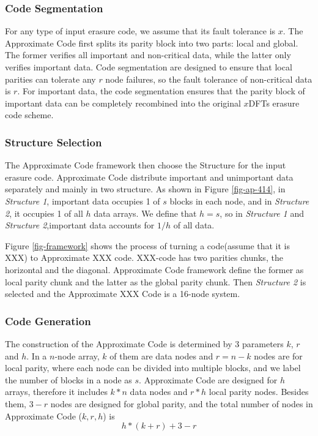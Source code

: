 \documentclass[sigconf]{acmart}
\begin{document}
\subsubsection{Code Segmentation}
For any type of input erasure code, we assume that its fault tolerance is $x$. The Approximate Code first splits its parity block into two parts: local and global. The former verifies all important and non-critical data, while the latter only verifies important data. Code segmentation are designed to ensure that local parities can tolerate any $r$ node failures, so the fault tolerance of non-critical data is $r$. For important data, the code segmentation ensures that the parity block of important data can be completely recombined into the original $x$DFTs erasure code scheme.

\subsubsection{Structure Selection}
The Approximate Code framework then choose the Structure for the input erasure code.
Approximate Code distribute important and unimportant data separately and mainly in two structure. As shown in Figure \ref{fig-ap-414}, in \emph{Structure 1}, important data occupies 1 of $s$ blocks in each node, and in \emph{Structure 2}, it occupies 1 of all $h$ data arrays.
We define that $h=s$, so in \emph{Structure 1} and \emph{Structure 2},important data accounts for $1/h$ of all data.

Figure \ref{fig-framework} shows the process of turning a code(assume that it is XXX) to Approximate XXX code. XXX-code has two parities chunks, the horizontal and the diagonal. Approximate Code framework define the former as local parity chunk and the latter as the global parity chunk. Then \emph{Structure 2} is selected and the Approximate XXX Code is a 16-node system.

\subsubsection{Code Generation}

The construction of the Approximate Code is determined by 3 parameters $k$, $r$ and $h$. 
In a $n$-node array, $k$ of them are data nodes and $r=n-k$ nodes are for local parity, where each node can be divided into multiple blocks, and we label the number of blocks in a node as $s$.
Approximate Code are designed for $h$ arrays, therefore it includes $k*n$ data nodes and $r*h$ local parity nodes.
Besides them, $3-r$ nodes are designed for global parity, and the total number of nodes in Approximate Code ($k,r,h$) is $$h*(k+r) +3-r$$
\end{document}

